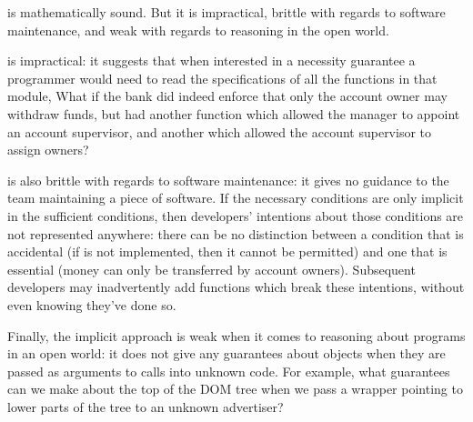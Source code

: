  is mathematically sound. But it is impractical, brittle with
regards to software maintenance, and weak with regards to reasoning in
the open world.


 is impractical: it suggests that when interested in
a necessity guarantee a programmer would need to read the
specifications of all the functions in that module, 
What if the bank did indeed enforce that only the account owner may withdraw
funds, but had another function which allowed the manager to appoint
an account supervisor, and another which allowed the account
supervisor to assign owners?

 is also brittle with regards to software maintenance:
 it gives no guidance to the team maintaining a piece of
software.  If the necessary conditions are only implicit in the
sufficient conditions, then developers' intentions about those
conditions are not represented anywhere: there can be no distinction
between a condition that is accidental (if  is not
implemented, then it cannot be permitted) and one that is essential
(money can only be transferred by account owners).
Subsequent developers may inadvertently add functions which break these
intentions, without even knowing they've done so.

Finally, the implicit approach  is   weak when it comes to reasoning
about programs in an open world:  it does not give any
guarantees about objects when they are passed as arguments to calls
into unknown code. For example, what guarantees can we make about the
top of the DOM tree when we pass a wrapper pointing to lower parts of
the tree to an unknown advertiser?
